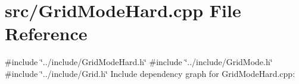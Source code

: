 \section{src/\-Grid\-Mode\-Hard.cpp \-File \-Reference}
\label{_grid_mode_hard_8cpp}
{\ttfamily \#include \char`\"{}../include/\-Grid\-Mode\-Hard.\-h\char`\"{}}\*
{\ttfamily \#include \char`\"{}../include/\-Grid\-Mode.\-h\char`\"{}}\*
{\ttfamily \#include \char`\"{}../include/\-Grid.\-h\char`\"{}}\*
\-Include dependency graph for \-Grid\-Mode\-Hard.\-cpp\-:
